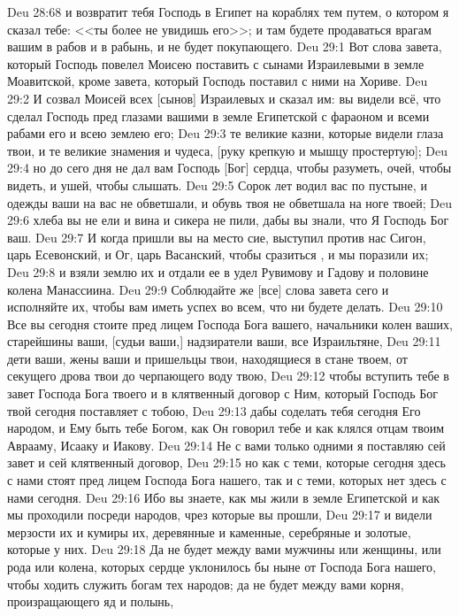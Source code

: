 \vs Deu 28:68 и возвратит тебя Господь в Египет на кораблях тем путем, о котором я сказал тебе: <<ты более не увидишь его>>; и там будете продаваться врагам вашим в рабов и в рабынь, и не будет покупающего.
\vs Deu 29:1 Вот слова завета, который Господь повелел Моисею поставить с сынами Израилевыми в земле Моавитской, кроме завета, который Господь поставил с ними на Хориве.
\rsbpar\vs Deu 29:2 И созвал Моисей всех [сынов] Израилевых и сказал им: вы видели всё, что сделал Господь пред глазами вашими в земле Египетской с фараоном и всеми рабами его и всею землею его;
\vs Deu 29:3 те великие казни, которые видели глаза твои, и те великие знамения и чудеса, [руку крепкую и мышцу простертую];
\vs Deu 29:4 но до сего дня не дал вам Господь [Бог] сердца, чтобы разуметь, очей, чтобы видеть, и ушей, чтобы слышать.
\vs Deu 29:5 Сорок лет водил вас по пустыне, и одежды ваши на вас не обветшали, и обувь твоя не обветшала на ноге твоей;
\vs Deu 29:6 хлеба вы не ели и вина и сикера не пили, дабы вы знали, что Я Господь Бог ваш.
\vs Deu 29:7 И когда пришли вы на место сие, выступил против нас Сигон, царь Есевонский, и Ог, царь Васанский, чтобы сразиться , и мы поразили их;
\vs Deu 29:8 и взяли землю их и отдали ее в удел  Рувимову и Гадову и половине колена Манассиина.
\vs Deu 29:9 Соблюдайте же [все] слова завета сего и исполняйте их, чтобы вам иметь успех во всем, что ни будете делать.
\vs Deu 29:10 Все вы сегодня стоите пред лицем Господа Бога вашего, начальники колен ваших, старейшины ваши, [судьи ваши,] надзиратели ваши, все Израильтяне,
\vs Deu 29:11 дети ваши, жены ваши и пришельцы твои, находящиеся в стане твоем, от секущего дрова твои до черпающего воду твою,
\vs Deu 29:12 чтобы вступить тебе в завет Господа Бога твоего и в клятвенный договор с Ним, который Господь Бог твой сегодня поставляет с тобою,
\vs Deu 29:13 дабы соделать тебя сегодня Его народом, и Ему быть тебе Богом, как Он говорил тебе и как клялся отцам твоим Аврааму, Исааку и Иакову.
\vs Deu 29:14 Не с вами только одними я поставляю сей завет и сей клятвенный договор,
\vs Deu 29:15 но как с теми, которые сегодня здесь с нами стоят пред лицем Господа Бога нашего, так и с теми, которых нет здесь с нами сегодня.
\vs Deu 29:16 Ибо вы знаете, как мы жили в земле Египетской и как мы проходили посреди народов, чрез которые вы прошли,
\vs Deu 29:17 и видели мерзости их и кумиры их, деревянные и каменные, серебряные и золотые, которые у них.
\vs Deu 29:18 Да не будет между вами мужчины или женщины, или рода или колена, которых сердце уклонилось бы ныне от Господа Бога нашего, чтобы ходить служить богам тех народов; да не будет между вами корня, произращающего яд и полынь,
